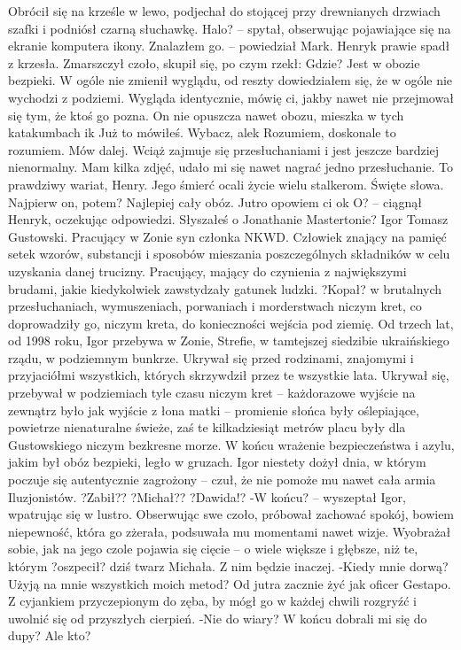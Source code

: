 \documentclass[../MAIN.tex]{subfiles}
\begin{document}
Obrócił się na krześle w lewo, podjechał do stojącej przy drewnianych drzwiach szafki i podniósł czarną słuchawkę.
\sx Halo? -- spytał, obserwując pojawiające się na ekranie komputera ikony.
\xx Znalazłem go. -- powiedział Mark.
\qd
Henryk prawie spadł z krzesła. Zmarszczył czoło, skupił się, po czym rzekł:
\sx Gdzie?
\xx Jest w obozie bezpieki. W ogóle nie zmienił wyglądu, od reszty dowiedziałem się, że w ogóle nie wychodzi z podziemi. Wygląda identycznie, mówię ci, jakby nawet nie przejmował się tym, że ktoś go pozna. On nie opuszcza nawet obozu, mieszka w tych katakumbach i\3k
\xx Już to mówiłeś.
\xx Wybacz, ale\3k
\xx Rozumiem, doskonale to rozumiem. Mów dalej.
\xx Wciąż zajmuje się przesłuchaniami i jest jeszcze bardziej nienormalny. Mam kilka zdjęć, udało mi się nawet nagrać jedno przesłuchanie. To prawdziwy wariat, Henry. Jego śmierć ocali życie wielu stalkerom.
\xx Święte słowa. Najpierw on, potem?
\xx Najlepiej cały obóz. Jutro opowiem ci o\3k
\xx O? -- ciągnął Henryk, oczekując odpowiedzi.
\xx Słyszałeś o Jonathanie Mastertonie?
\qd
% 
% 
Igor Tomasz Gustowski.
Pracujący w Zonie syn członka NKWD. Człowiek znający na pamięć setek wzorów, substancji i sposobów mieszania poszczególnych składników w celu uzyskania danej trucizny. Pracujący, mający do czynienia z największymi brudami, jakie kiedykolwiek zawstydzały gatunek ludzki. ?Kopał? w brutalnych przesłuchaniach, wymuszeniach, porwaniach i morderstwach niczym kret, co doprowadziły go, niczym kreta, do konieczności wejścia pod ziemię.
Od trzech lat, od 1998 roku, Igor przebywa w Zonie, Strefie, w tamtejszej siedzibie ukraińskiego rządu, w podziemnym bunkrze. Ukrywał się przed rodzinami, znajomymi i przyjaciółmi wszystkich, których skrzywdził przez te wszystkie lata.
Ukrywał się, przebywał w podziemiach tyle czasu niczym kret -- każdorazowe wyjście na zewnątrz było jak wyjście z łona matki -- promienie słońca były oślepiające, powietrze nienaturalne świeże, zaś te kilkadziesiąt metrów placu były dla Gustowskiego niczym bezkresne morze.
W końcu wrażenie bezpieczeństwa i azylu, jakim był obóz bezpieki, legło w gruzach. Igor niestety dożył dnia, w którym poczuje się autentycznie zagrożony -- czuł, że nie pomoże mu nawet cała armia Iluzjonistów.
?Zabił??
?Michał??
?Dawida!?
-W końcu? -- wyszeptał Igor, wpatrując się w lustro. Obserwując swe czoło, próbował zachować spokój, bowiem niepewność, która go zżerała, podsuwała mu momentami nawet wizje. Wyobrażał sobie, jak na jego czole pojawia się cięcie -- o wiele większe i głębsze, niż te, którym ?oszpecił? dziś twarz Michała. Z nim będzie inaczej.
-Kiedy mnie dorwą? Użyją na mnie wszystkich moich metod?
Od jutra zacznie żyć jak oficer Gestapo. Z cyjankiem przyczepionym do zęba, by mógł go w każdej chwili rozgryźć i uwolnić się od przyszłych cierpień.
-Nie do wiary? W końcu dobrali mi się do dupy?
Ale kto?
\end{document}

